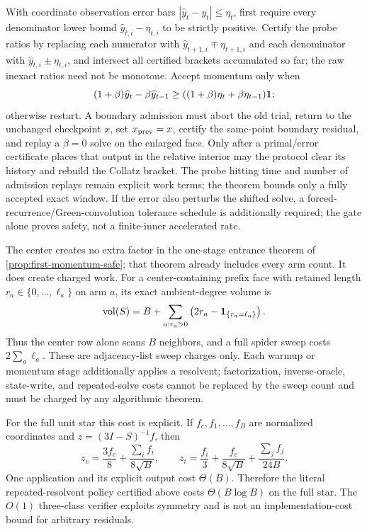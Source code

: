 With coordinate observation error bars
$|\widehat y_t-y_t|\leq\eta_t$, first require every denominator lower bound
$\widehat y_{t,i}-\eta_{t,i}$ to be strictly positive.  Certify the probe
ratios by replacing each numerator with $\widehat y_{t+1,i}\mp\eta_{t+1,i}$
and each denominator with $\widehat y_{t,i}\pm\eta_{t,i}$, and intersect all
certified brackets accumulated so far; the raw inexact ratios need not be
monotone.  Accept
momentum only when
\begin{equation*}
 (1+\beta)\widehat y_t-\beta\widehat y_{t-1}
 \geq((1+\beta)\eta_t+\beta\eta_{t-1})\mathbf{1};
\end{equation*}
otherwise restart.  A boundary admission must abort the old trial, return to
the unchanged checkpoint $x$, set $x_{\rm prev}=x$, certify the same-point
boundary residual, and replay a $\beta=0$ solve on the enlarged face.  Only
after a primal/error certificate places that output in the relative interior
may the protocol clear its history and rebuild the Collatz bracket.  The
probe hitting time and number of admission replays remain explicit work terms;
the theorem bounds only a fully accepted exact window.  If the error also
perturbs the shifted solve, a forced-recurrence/Green-convolution tolerance
schedule is additionally required; the gate alone proves safety, not a
finite-inner accelerated rate.




The center creates no extra factor in the one-stage entrance theorem of
\cref{prop:first-momentum-safe}; that theorem already includes every arm
count.  It does create charged work.  For a center-containing prefix face
with retained length \(r_a\in\{0,\ldots,\ell_a\}\) on arm \(a\), its exact
ambient-degree volume is
\begin{equation}
 \operatorname{vol}(S)=B+\sum_{a:r_a>0}
 \left(2r_a-\mathbf 1_{\{r_a=\ell_a\}}\right).
 \label{eq:spider-prefix-volume}
\end{equation}
Thus the center row alone scans \(B\) neighbors, and a full spider sweep
costs \(2\sum_a\ell_a\).  These are adjacency-list sweep charges only.  Each
warmup or momentum stage additionally applies a resolvent; factorization,
inverse-oracle, state-write, and repeated-solve costs cannot be replaced by
the sweep count and must be charged by any algorithmic theorem.

For the full unit star this cost is explicit.  If $f_c,f_1,\ldots,f_B$ are
normalized coordinates and $z=(3I-S)^{-1}f$, then
\[
 z_c=\frac{3f_c}{8}+\frac{\sum_i f_i}{8\sqrt B},\qquad
 z_i=\frac{f_i}{3}+\frac{f_c}{8\sqrt B}
       +\frac{\sum_j f_j}{24B}.
\]
One application and its explicit output cost $\Theta(B)$.  Therefore the
literal repeated-resolvent policy certified above costs
$\Theta(B\log B)$ on the full star.  The $O(1)$ three-class verifier exploits
symmetry and is not an implementation-cost bound for arbitrary residuals.

